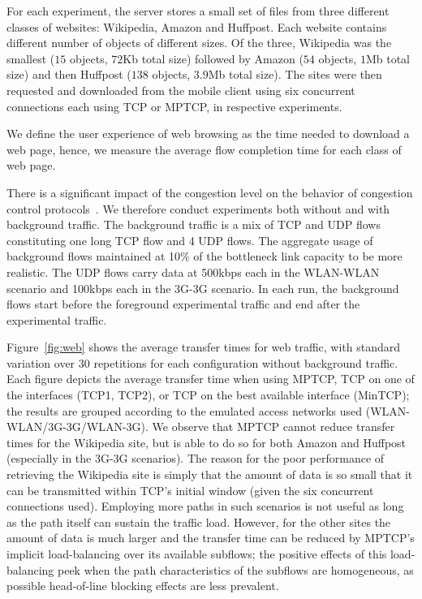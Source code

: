 For each experiment, the server stores a small set of files from three different classes
of websites: Wikipedia, Amazon and Huffpost. Each website contains different number of objects of different sizes. 
Of the three, Wikipedia was the smallest ($15$ objects, $72$Kb total size) followed by Amazon ($54$ objects, $1$Mb total size) 
and then Huffpost ($138$ objects, $3.9$Mb total size). The sites were then requested and downloaded from the mobile 
client using six concurrent connections each using TCP or MPTCP, in respective experiments.

We define the user experience of web browsing as the time needed to download a web page, hence, we measure the average flow completion 
time for each class of web page.

There is a significant impact of the congestion level on the behavior of congestion control protocols~\cite{ha-background-traffic-comnet-2007}. 
We therefore conduct experiments both without and with background traffic.  The background traffic is a mix of TCP and UDP flows constituting one 
long TCP flow and 4 UDP flows. The aggregate usage of background flows maintained at 10\% of the bottleneck link capacity to be more realistic. 
The UDP flows carry data at 500kbps each in the WLAN-WLAN scenario and 100kbps each in the 3G-3G scenario.  In each run, the background flows 
start before the foreground experimental traffic and end after the experimental traffic.


Figure~\ref{fig:web} shows the average transfer times for web traffic, with standard variation over $30$ repetitions for 
each configuration without background traffic. Each figure depicts the average transfer time when using MPTCP, 
TCP on one of the interfaces (TCP1, TCP2), or TCP on the best available interface (MinTCP); the results are grouped according
to the emulated access networks used (WLAN-WLAN/3G-3G/WLAN-3G). We observe that MPTCP cannot reduce transfer times for the Wikipedia site, 
but is able to do so for both Amazon and Huffpost (especially in the 3G-3G scenarios). The reason for the poor performance of retrieving 
the Wikipedia site is simply that the amount of data is so small that it can be transmitted within TCP's initial window (given the six 
concurrent connections used). Employing more paths in such scenarios is not useful as long as the path itself can sustain the traffic load. 
However, for the other sites the amount of data is much larger and the transfer time can be reduced by MPTCP's implicit load-balancing over 
its available subflows; the positive effects of this load-balancing peek when the path characteristics of the subflows are homogeneous, as 
possible head-of-line blocking effects are less prevalent.


